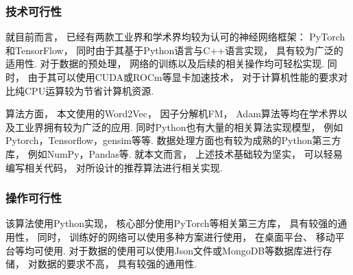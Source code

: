 \subsubsection{技术可行性}

就目前而言，
已经有两款工业界和学术界均较为认可的神经网络框架：
PyTorch和TensorFlow，
同时由于其基于Python语言与C++语言实现，
具有较为广泛的适用性.
对于数据的预处理，
网络的训练以及后续的相关操作均可轻松实现.
同时，
由于其可以使用CUDA或ROCm等显卡加速技术，
对于计算机性能的要求对比纯CPU运算较为节省计算机资源.

算法方面，
本文使用的Word2Vec，
因子分解机FM，
Adam算法等均在学术界以及工业界拥有较为广泛的应用.
同时Python也有大量的相关算法实现模型，
例如Pytorch，Tensorflow，gensim等等.
数据处理方面也有较为成熟的Python第三方库，
例如NumPy，Pandas等.
就本文而言，
上述技术基础较为坚实，
可以轻易编写相关代码，
对所设计的推荐算法进行相关实现.

\subsubsection{操作可行性}

该算法使用Python实现，
核心部分使用PyTorch等相关第三方库，
具有较强的通用性，
同时，
训练好的网络可以使用多种方案进行使用，
在桌面平台、
移动平台等均可使用.
对于数据的使用可以使用Json文件或MongoDB等数据库进行存储，
对数据的要求不高，
具有较强的通用性.
